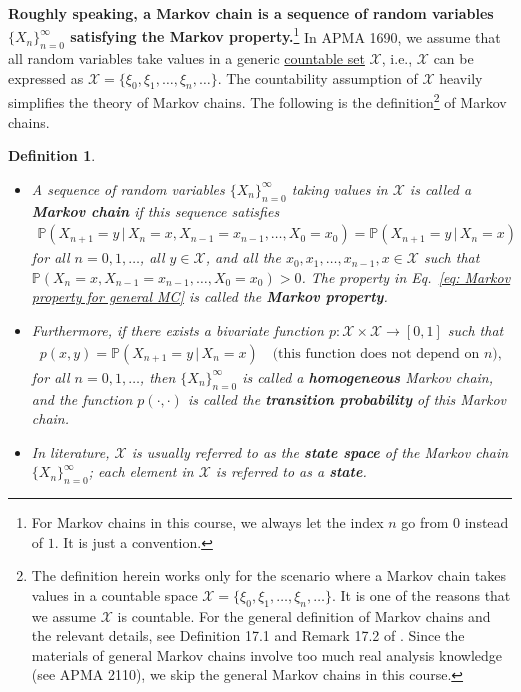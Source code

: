\documentclass[11pt,letterpaper, leqno]{article}
\newtheorem{definition}{Definition}
\numberwithin{equation}{section}
\numberwithin{theorem}{section}
\numberwithin{lemma}{section}
\numberwithin{corollary}{section}
\numberwithin{definition}{section}
\numberwithin{proposition}{section}
\numberwithin{remark}{section}
\numberwithin{example}{section}
\begin{document}
\textbf{Roughly speaking, a Markov chain is a sequence of random variables $\{X_n\}_{n=0}^\infty$ satisfying the Markov property.}\footnote{ For Markov chains in this course, we always let the index $n$ go from $0$ instead of $1$. It is just a convention.} In APMA 1690, we assume that all random variables take values in a generic \href{https://en.wikipedia.org/wiki/Countable_set}{countable set} $\mathcal{X}$, i.e., $\mathcal{X}$ can be expressed as $\mathcal{X}=\{\xi_0, \xi_1,\ldots, \xi_n,\ldots\}$. The countability assumption of $\mathcal{X}$ heavily simplifies the theory of Markov chains. The following is the definition\footnote{ The definition herein works only for the scenario where a Markov chain takes values in a countable space $\mathcal{X}=\{\xi_0, \xi_1,\ldots, \xi_n,\ldots\}$. It is one of the reasons that we assume $\mathcal{X}$ is countable. For the general definition of Markov chains and the relevant details, see Definition 17.1 and Remark 17.2 of \cite{klenke2013probability}. Since the materials of general Markov chains involve too much real analysis knowledge (see APMA 2110), we skip the general Markov chains in this course.} of Markov chains.
\begin{definition}
\begin{itemize}
    \item A sequence of random variables $\{X_n\}_{n=0}^\infty$ taking values in $\mathcal{X}$ is called a \textbf{Markov chain} if this sequence satisfies
\begin{align}\label{eq: Markov property for general MC}
    \boxed{ \mathbb{P}(X_{n+1}=y \,\vert \, X_n=x, X_{n-1}=x_{n-1},\ldots, X_0=x_0 )=\mathbb{P}(X_{n+1}=y\,\vert \, X_n=x) }
\end{align}
for all $n=0,1,\ldots$, all $y\in\mathcal{X}$, and all the $x_0, x_1,\ldots,x_{n-1},x\in\mathcal{X}$ such that $\mathbb{P}(X_n=x, X_{n-1}=x_{n-1},\ldots, X_0=x_0 )>0$. The property in Eq.~\eqref{eq: Markov property for general MC} is called the \textbf{Markov property}. 
\item Furthermore, if there exists a bivariate function $p:\mathcal{X}\times \mathcal{X}\rightarrow[0,1]$ such that 
\begin{align*}
    \boxed{ p(x,y)=\mathbb{P}(X_{n+1}=y\,\vert \, X_n=x)\ \ \ \mbox{ (this function does not depend on $n$)}, }
\end{align*}
for all $n=0,1,\ldots$, then $\{X_n\}_{n=0}^\infty$ is called a \textbf{homogeneous} Markov chain, and the function $p(\cdot,\cdot)$ is called the \textbf{transition probability} of this Markov chain.
\item In literature, $\mathcal{X}$ is usually referred to as the \textbf{state space} of the Markov chain $\{X_n\}_{n=0}^\infty$; each element in $\mathcal{X}$ is referred to as a \textbf{state}.
\end{itemize}
\end{definition}
\end{document}
